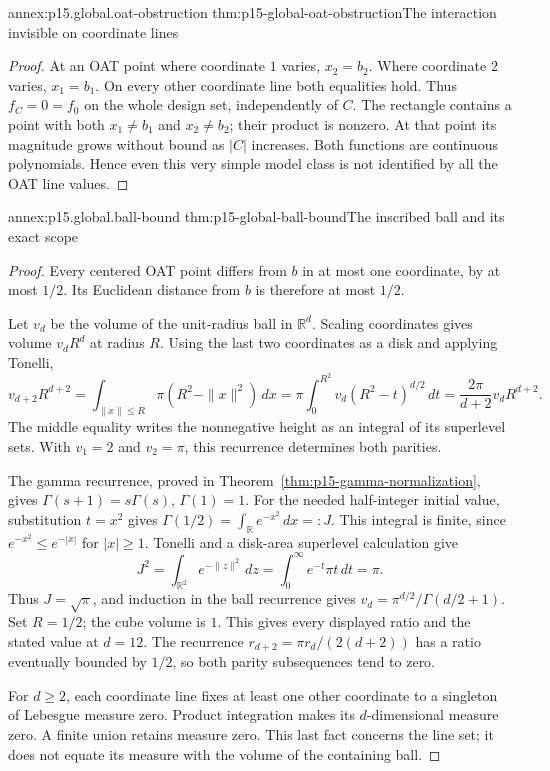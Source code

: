 \begin{annexitem}{annex:p15.global.oat-obstruction}
 {thm:p15-global-oat-obstruction}{The interaction invisible on coordinate lines}
\begin{proof}
At an OAT point where coordinate \(1\) varies, \(x_2=b_2\).
Where coordinate \(2\) varies, \(x_1=b_1\).
On every other coordinate line both equalities hold.
Thus \(f_C=0=f_0\) on the whole design set, independently of \(C\).
The rectangle contains a point with both \(x_1\ne b_1\) and
\(x_2\ne b_2\); their product is nonzero.
At that point its magnitude grows without bound as \(|C|\) increases.
Both functions are continuous polynomials. Hence even this very simple
model class is not identified by all the OAT line values.
\end{proof}
\end{annexitem}

\begin{annexitem}{annex:p15.global.ball-bound}
 {thm:p15-global-ball-bound}{The inscribed ball and its exact scope}
\begin{proof}
Every centered OAT point differs from \(b\) in at most one coordinate,
by at most \(1/2\). Its Euclidean distance from \(b\) is therefore at
most \(1/2\).

Let \(v_d\) be the volume of the unit-radius ball in \(\mathbb R^d\).
Scaling coordinates gives volume \(v_dR^d\) at radius \(R\).
Using the last two coordinates as a disk and applying Tonelli,
\[
 v_{d+2}R^{d+2}
   =\int_{\|x\|\leq R}\pi(R^2-\|x\|^2)\,dx
   =\pi\int_0^{R^2}v_d(R^2-t)^{d/2}\,dt
   =\frac{2\pi}{d+2}v_dR^{d+2}.
\]
The middle equality writes the nonnegative height as an integral of
its superlevel sets. With \(v_1=2\) and \(v_2=\pi\), this recurrence
determines both parities.

The gamma recurrence, proved in
Theorem~\ref{thm:p15-gamma-normalization}, gives
\(\Gamma(s+1)=s\Gamma(s)\), \(\Gamma(1)=1\).
For the needed half-integer initial value, substitution \(t=x^2\)
gives
\(\Gamma(1/2)=\int_{\mathbb R}e^{-x^2}\,dx=:J\).
This integral is finite, since \(e^{-x^2}\leq e^{-|x|}\) for
\(|x|\geq1\). Tonelli and a disk-area superlevel calculation give
\[
 J^2=\int_{\mathbb R^2}e^{-\|z\|^2}\,dz
     =\int_0^\infty e^{-t}\pi t\,dt=\pi.
\]
Thus \(J=\sqrt\pi\), and induction in the ball recurrence gives
\(v_d=\pi^{d/2}/\Gamma(d/2+1)\).
Set \(R=1/2\); the cube volume is \(1\).
This gives every displayed ratio and the stated value at \(d=12\).
The recurrence
\(r_{d+2}=\pi r_d/(2(d+2))\)
has a ratio eventually bounded by \(1/2\), so both parity subsequences
tend to zero.

For \(d\geq2\), each coordinate line fixes at least one other coordinate
to a singleton of Lebesgue measure zero. Product integration makes its
\(d\)-dimensional measure zero. A finite union retains measure zero.
This last fact concerns the line set; it does not equate its measure
with the volume of the containing ball.
\end{proof}
\end{annexitem}


